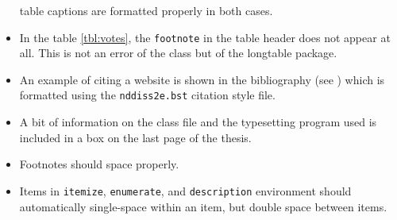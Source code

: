 \documentclass[numrefs,sort&compress]{nddiss2e}
\begin{document}
\begin{itemize}
table captions are formatted properly in both cases.
\item In the table \ref{tbl:votes}, the \verb+footnote+ in the table header 
does not appear at all. This is not an error of the \nddiss\/ class but of the
\textsf{longtable} package.
\item An example of citing a website is shown in the bibliography (see
\citep{gairley2000}) which is formatted using the \verb+nddiss2e.bst+
citation style file.
\item A bit of information on the \nddiss\/ class file and the typesetting program
used is included in a box on the last page of the thesis.
\item Footnotes should space properly.
\item Items in \verb+itemize+, \verb+enumerate+, and \verb+description+ environment
should automatically single-space within an item, but double space between items.
\end{itemize}

%
%




%
%



%
%



%
%



%
%



%
%



%
%




%
%

\appendix




%
%

 \backmatter
 
\end{document}

